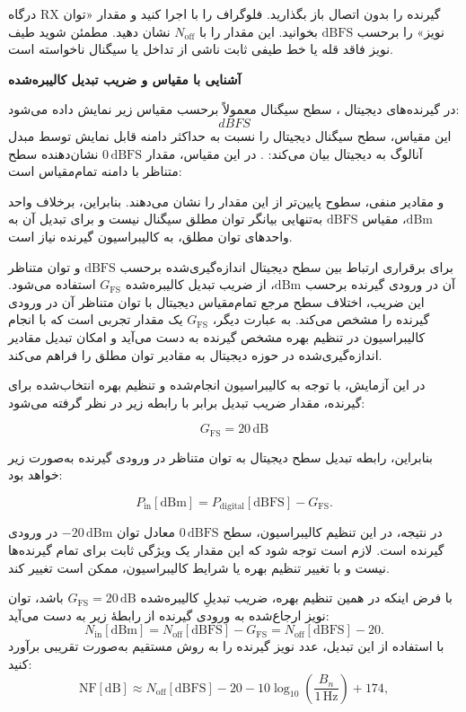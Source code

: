 \documentclass[a4paper,11pt]{article}
\begin{document}
\label{part:cal}
\begin{steps}
\item درگاه RX گیرنده را بدون اتصال باز بگذارید.
فلوگراف
را با
اجرا کنید و مقدار «توان نویز» را برحسب
$\mathrm{dBFS}$
بخوانید. این مقدار را با
$N_{\mathrm{off}}$
نشان دهید. مطمئن شوید طیف نویز فاقد قله یا خط طیفی ثابت
ناشی از تداخل یا سیگنال ناخواسته است.
 
\item \textbf{آشنایی با مقیاس  و ضریب تبدیل کالیبره‌شده}

در گیرنده‌های دیجیتال ، سطح سیگنال معمولاً برحسب مقیاس زیر نمایش داده می‌شود:
\[dBFS\]
این مقیاس، سطح سیگنال دیجیتال را نسبت به حداکثر دامنه قابل نمایش توسط مبدل آنالوگ به دیجیتال بیان می‌کند:
. در این مقیاس، مقدار \(0\,\mathrm{dBFS}\) نشان‌دهنده سطح متناظر با دامنه تمام‌مقیاس است:

و مقادیر منفی، سطوح پایین‌تر از این مقدار را نشان می‌دهند. بنابراین، برخلاف واحد \(\mathrm{dBm}\)، مقیاس \(\mathrm{dBFS}\) به‌تنهایی بیانگر توان مطلق سیگنال نیست و برای تبدیل آن به واحدهای توان مطلق، به کالیبراسیون گیرنده نیاز است.

برای برقراری ارتباط بین سطح دیجیتال اندازه‌گیری‌شده برحسب \(\mathrm{dBFS}\) و توان متناظر آن در ورودی گیرنده برحسب \(\mathrm{dBm}\)، از ضریب تبدیل کالیبره‌شده \(G_{\mathrm{FS}}\) استفاده می‌شود. این ضریب، اختلاف سطح مرجع تمام‌مقیاس دیجیتال با توان متناظر آن در ورودی گیرنده را مشخص می‌کند. به عبارت دیگر، \(G_{\mathrm{FS}}\) یک مقدار تجربی است که با انجام کالیبراسیون در تنظیم بهره مشخص گیرنده به دست می‌آید و امکان تبدیل مقادیر اندازه‌گیری‌شده در حوزه دیجیتال به مقادیر توان مطلق را فراهم می‌کند.

در این آزمایش، با توجه به کالیبراسیون انجام‌شده و تنظیم بهره انتخاب‌شده برای گیرنده، مقدار ضریب تبدیل برابر با رابطه زیر در نظر گرفته می‌شود:

\[
G_{\mathrm{FS}}=20\,\mathrm{dB}
\]

بنابراین، رابطه تبدیل سطح دیجیتال به توان متناظر در ورودی گیرنده به‌صورت زیر خواهد بود:

\[
P_{\mathrm{in}}[\mathrm{dBm}]
=
P_{\mathrm{digital}}[\mathrm{dBFS}]
-
G_{\mathrm{FS}}.
\]

در نتیجه، در این تنظیم کالیبراسیون، سطح \(0\,\mathrm{dBFS}\) معادل توان \(-20\,\mathrm{dBm}\) در ورودی گیرنده است. لازم است توجه شود که این مقدار یک ویژگی ثابت برای تمام گیرنده‌ها نیست و با تغییر تنظیم بهره یا شرایط کالیبراسیون، ممکن است تغییر کند.
\item با فرض اینکه در همین تنظیم بهره، ضریب تبدیلِ کالیبره‌شده
$G_{\mathrm{FS}}=20\,\mathrm{dB}$
باشد، توان نویز ارجاع‌شده به ورودی گیرنده از رابطهٔ زیر به دست می‌آید:
\[
N_{\mathrm{in}}[\mathrm{dBm}]
=
N_{\mathrm{off}}[\mathrm{dBFS}]
-
G_{\mathrm{FS}}
=
N_{\mathrm{off}}[\mathrm{dBFS}]-20.
\]
با استفاده از این تبدیل، عدد نویز گیرنده را به روش مستقیم
به‌صورت تقریبی برآورد کنید:
\[
\mathrm{NF}[\mathrm{dB}]
\approx
N_{\mathrm{off}}[\mathrm{dBFS}]
-
20
-
10\log_{10}\!\left(\frac{B_n}{1\,\mathrm{Hz}}\right)
+
174,
\]


\end{steps}
\end{document}
